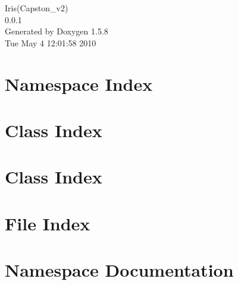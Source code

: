 \documentclass[a4paper]{book}
\begin{document}
\begin{titlepage}
\vspace*{7cm}
\begin{center}
{\Large Iris(Capston\_\-v2) \\[1ex]\large 0.0.1 }\\
\vspace*{1cm}
{\large Generated by Doxygen 1.5.8}\\
\vspace*{0.5cm}
{\small Tue May 4 12:01:58 2010}\\
\end{center}
\end{titlepage}
\clearemptydoublepage
{}
\tableofcontents
\clearemptydoublepage
{}
\chapter{Namespace Index}

\chapter{Class Index}

\chapter{Class Index}

\chapter{File Index}

\chapter{Namespace Documentation}

\end{document}
